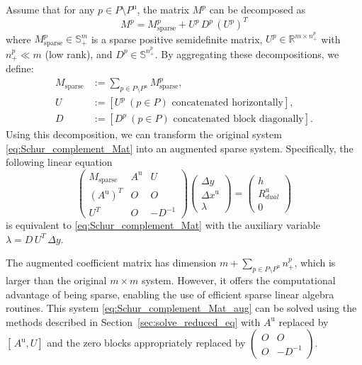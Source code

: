 Assume that for any $p\in P\setminus P^{\text{u}}$, the matrix $M^p$ can be decomposed as
\begin{equation}
  M^p = M^p_{\mathrm{sparse}} + U^p\, D^p\, (U^p)^T
  \label{eq:low_rank_perturbation}
\end{equation}
where $M^p_{\mathrm{sparse}} \in \mathbb{S}^m_+$ is a sparse positive semidefinite matrix, 
$U^p \in \mathbb{R}^{m\times n^p_+}$ with $n^p_+ \ll m$ (low rank), 
and $D^p\in \mathbb{S}^{n^p_+}$.
By aggregating these decompositions, we define:
\begin{align*}
  M_{\mathrm{sparse}} &:= \sum_{p\in P\setminus P^{\text{u}}} M^p_{\mathrm{sparse}}, \\
  U &:= [U^p ~ (p\in P) \text{ concatenated horizontally}], \\
  D &:= [D^p ~ (p\in P) \text{ concatenated block diagonally}].
\end{align*}
Using this decomposition, we can transform the original system \eqref{eq:Schur_complement_Mat} 
into an augmented sparse system. Specifically, the following linear equation
\begin{equation}
  \begin{pmatrix}
    M_{\mathrm{sparse}} & A^{\text{u}} & U \\
    (A^{\text{u}})^T & O & O \\
    U^T & O & -D^{-1}
  \end{pmatrix}
  \begin{pmatrix}
    \Delta y \\
    \Delta x^{\text{u}} \\
    \lambda
  \end{pmatrix}
  =
  \begin{pmatrix}
    h \\
    R^{\text{u}}_{dual} \\
    0
  \end{pmatrix}
  \label{eq:Schur_complement_Mat_aug}
\end{equation}
is equivalent to \eqref{eq:Schur_complement_Mat} with the auxiliary variable $\lambda = D\,U^T\,\Delta y$.

The augmented coefficient matrix has dimension $m+\sum_{p\in P\setminus P^{\text{u}}} n^p_+$, 
which is larger than the original $m \times m$ system. 
However, it offers the computational advantage of being sparse, 
enabling the use of efficient sparse linear algebra routines.
This system \eqref{eq:Schur_complement_Mat_aug} can be solved using the methods 
described in Section~\ref{sec:solve_reduced_eq} with 
$A^{\text{u}}$ replaced by $[\,A^{\text{u}}, U]$ and the zero blocks appropriately replaced by 
$\begin{pmatrix} O & O \\ O & -D^{-1} \end{pmatrix}$.

